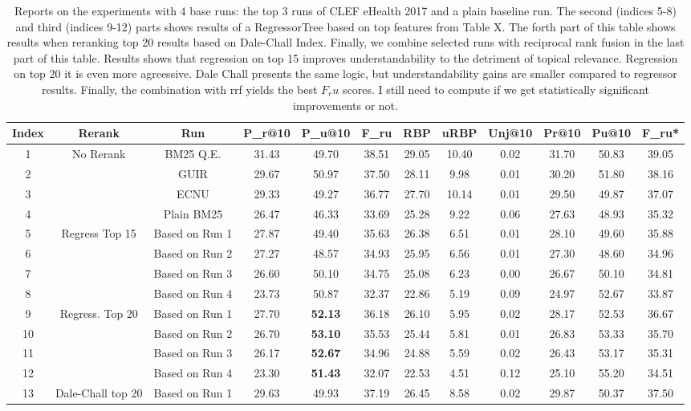 \begin{table}
\caption{Reports on the experiments with 4 base runs: the top 3 runs of CLEF eHealth 2017 and a plain baseline run. The second (indices 5-8) and third (indices 9-12) parts shows results of a RegressorTree based on top features from Table X. The forth part of this table shows results when reranking top 20 results based on Dale-Chall Index. Finally, we combine selected runs with reciprocal rank fusion in the last part of this table. Results shows that regression on top 15 improves
    understandability to the detriment of topical relevance. Regression on top 20 it is even more agreessive. Dale Chall presents the same logic, but understandability gains are smaller compared to regressor results. Finally, the combination with rrf yields the best $F_ru$ scores. I still need to compute if we get statistically significant improvements or not.}
\label{tab:experiments}
\begin{tabular}{c|c|c|ccc|cc|c|ccc}
\toprule 
Index & Rerank & Run & P\_r@10 & P\_u@10 & F\_ru & RBP & uRBP & Unj@10 & Pr@10 & Pu@10 & F\_ru{*}\tabularnewline
\midrule 
1 & \multirow{4}{*}{No Rerank} & BM25 Q.E. & 31.43 & 49.70 & 38.51 & 29.05 & 10.40 & 0.02 & 31.70 & 50.83 & 39.05\tabularnewline
2 &  & GUIR & 29.67 & 50.97 & 37.50 & 28.11 & 9.98 & 0.01 & 30.20 & 51.80 & 38.16\tabularnewline
3 &  & ECNU & 29.33 & 49.27 & 36.77 & 27.70 & 10.14 & 0.01 & 29.50 & 49.87 & 37.07\tabularnewline
4 &  & Plain BM25 & 26.47 & 46.33 & 33.69 & 25.28 & 9.22 & 0.06 & 27.63 & 48.93 & 35.32\tabularnewline
\midrule
5 & \multirow{4}{*}{Regress Top 15} & Based on Run 1 & 27.87 & 49.40 & 35.63 & 26.38 & 6.51 & 0.01 & 28.10 & 49.60 & 35.88\tabularnewline
6 &  & Based on Run 2 & 27.27 & 48.57 & 34.93 & 25.95 & 6.56 & 0.01 & 27.30 & 48.60 & 34.96\tabularnewline
7 &  & Based on Run 3  & 26.60 & 50.10 & 34.75 & 25.08 & 6.23 & 0.00 & 26.67 & 50.10 & 34.81\tabularnewline
8 &  & Based on Run 4 & 23.73 & 50.87 & 32.37 & 22.86 & 5.19 & 0.09 & 24.97 & 52.67 & 33.87\tabularnewline
\midrule 
9 & \multirow{4}{*}{Regress. Top 20} & Based on Run 1 & 27.70 & \textbf{52.13} & 36.18 & 26.10 & 5.95 & 0.02 & 28.17 & 52.53 & 36.67\tabularnewline
10 &  & Based on Run 2 & 26.70 & \textbf{53.10} & 35.53 & 25.44 & 5.81 & 0.01 & 26.83 & 53.33 & 35.70\tabularnewline
11 &  & Based on Run 3  & 26.17 & \textbf{52.67} & 34.96 & 24.88 & 5.59 & 0.02 & 26.43 & 53.17 & 35.31\tabularnewline
12 &  & Based on Run 4 & 23.30 & \textbf{51.43} & 32.07 & 22.53 & 4.51 & 0.12 & 25.10 & 55.20 & 34.51\tabularnewline
\midrule 
13 & \multirow{4}{*}{Dale-Chall top 20} & Based on Run 1 & 29.63 & 49.93 & 37.19 & 26.45 & 8.58 & 0.02 & 29.87 & 50.37 & 37.50\tabularnewline

\end{tabular}
\end{table}
